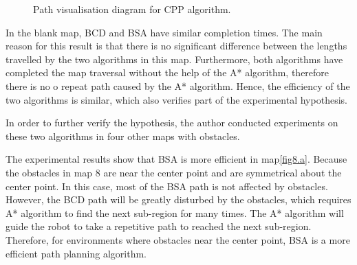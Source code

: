 \documentclass[conference]{IEEEtran}
\begin{document}
\begin{figure}[ht]
{\label{fig7e}
}\hspace{-16mm}
\quad
{}\hspace{-16mm}
\quad
{}\hspace{-16mm}
\quad
{}
\caption{Path visualisation diagram for CPP algorithm.}
\label{fig7h}
\label{fig7}
\end{figure}


In the blank map, BCD and BSA have similar completion times. The main reason for this result is that there is no significant difference between the lengths travelled by the two algorithms in this map. Furthermore, both algorithms have completed the map traversal without the help of the A* algorithm, therefore there is no o repeat path caused by the A* algorithm. Hence, the efficiency of the two algorithms is similar, which also verifies part of the experimental hypothesis.

In order to further verify the hypothesis, the author conducted experiments on these two algorithms in four other maps with obstacles.

The experimental results show that BSA is more efficient in map\ref{fig8.a}. Because the obstacles in map 8 are near the center point and are symmetrical about the center point. In this case, most of the BSA path is not affected by obstacles. However, the BCD path will be greatly disturbed by the obstacles, which requires A* algorithm to find the next sub-region for many times. The A* algorithm will guide the robot to take a repetitive path to reached the next sub-region. Therefore, for environments where obstacles near the center point, BSA is a more efficient path planning algorithm.
\end{document}
